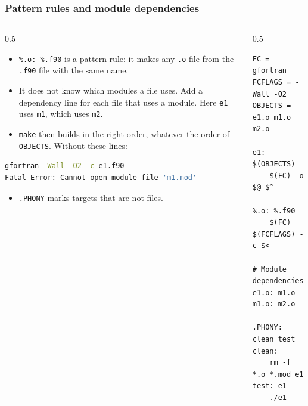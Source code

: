 \begin{frame}[fragile]
  \frametitle{Pattern rules and module dependencies}
  \begin{columns}[T]
    \begin{column}{0.5\textwidth}
      \begin{itemize}
        \item \texttt{\%.o: \%.f90} is a pattern rule: it makes any \texttt{.o} file from the \texttt{.f90} file with the same name.
        \item It does not know which modules a file uses. Add a dependency line for each file that uses a module. Here \texttt{e1} uses \texttt{m1}, which uses \texttt{m2}.
        \item \texttt{make} then builds in the right order, whatever the order of \texttt{OBJECTS}. Without these lines:
      \end{itemize}
      \begin{lstlisting}[language=bash]
gfortran -Wall -O2 -c e1.f90
Fatal Error: Cannot open module file 'm1.mod'
      \end{lstlisting}
      \begin{itemize}
        \item \texttt{.PHONY} marks targets that are not files.
      \end{itemize}
    \end{column}

    \begin{column}{0.5\textwidth}
      \begin{lstlisting}[language={[gnu]make}, tabsize=4]
FC = gfortran
FCFLAGS = -Wall -O2
OBJECTS = e1.o m1.o m2.o

e1: $(OBJECTS)
	$(FC) -o $@ $^

%.o: %.f90
	$(FC) $(FCFLAGS) -c $<

# Module dependencies
e1.o: m1.o
m1.o: m2.o

.PHONY: clean test
clean:
	rm -f *.o *.mod e1
test: e1
	./e1
      \end{lstlisting}
    \end{column}
  \end{columns}
\end{frame}



